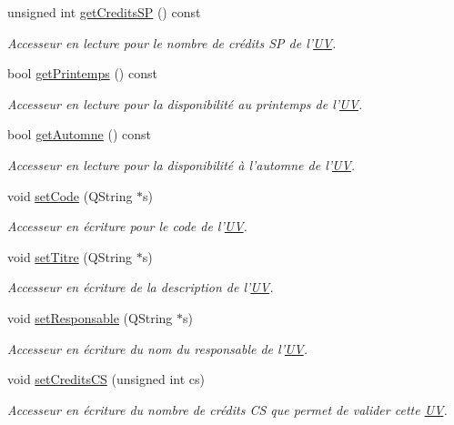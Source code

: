 \begin{DoxyCompactItemize}
unsigned int \hyperlink{class_u_v_aed52076b1de90d10e053a21af0177888}{get\-Credits\-S\-P} () const 
\begin{DoxyCompactList}\small\item\em Accesseur en lecture pour le nombre de crédits S\-P de l'\hyperlink{class_u_v}{U\-V}. \end{DoxyCompactList}\item 
bool \hyperlink{class_u_v_ae2684b0333772600b1726d7179048290}{get\-Printemps} () const 
\begin{DoxyCompactList}\small\item\em Accesseur en lecture pour la disponibilité au printemps de l'\hyperlink{class_u_v}{U\-V}. \end{DoxyCompactList}\item 
bool \hyperlink{class_u_v_a242e4f2727fbf300c313a285cc4a402f}{get\-Automne} () const 
\begin{DoxyCompactList}\small\item\em Accesseur en lecture pour la disponibilité à l'automne de l'\hyperlink{class_u_v}{U\-V}. \end{DoxyCompactList}\item 
void \hyperlink{class_u_v_a53218978cc9e02e0cfd3f463608ff3bc}{set\-Code} (Q\-String $\ast$s)
\begin{DoxyCompactList}\small\item\em Accesseur en écriture pour le code de l'\hyperlink{class_u_v}{U\-V}. \end{DoxyCompactList}\item 
void \hyperlink{class_u_v_a3bf96f55fa44e5cb47ac6e77dc807dd3}{set\-Titre} (Q\-String $\ast$s)
\begin{DoxyCompactList}\small\item\em Accesseur en écriture de la description de l'\hyperlink{class_u_v}{U\-V}. \end{DoxyCompactList}\item 
void \hyperlink{class_u_v_a8827081089cc76e07f5adff29fdecc6f}{set\-Responsable} (Q\-String $\ast$s)
\begin{DoxyCompactList}\small\item\em Accesseur en écriture du nom du responsable de l'\hyperlink{class_u_v}{U\-V}. \end{DoxyCompactList}\item 
void \hyperlink{class_u_v_ae3368f076bd26424b3778fdb491595db}{set\-Credits\-C\-S} (unsigned int cs)
\begin{DoxyCompactList}\small\item\em Accesseur en écriture du nombre de crédits C\-S que permet de valider cette \hyperlink{class_u_v}{U\-V}. \end{DoxyCompactList}\item 

\end{DoxyCompactItemize}
